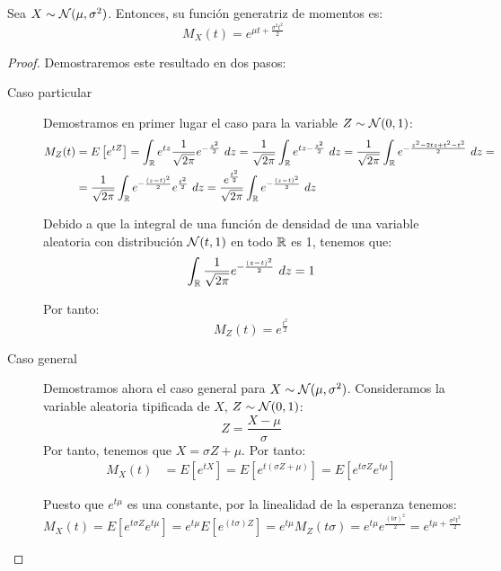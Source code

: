 \begin{prop}
    Sea $X\sim \mathcal{N}(\mu,\sigma^2)$. Entonces, su función generatriz de momentos es:
    \begin{equation*}
        M_X(t) = e^{\mu t + \frac{\sigma^2 t^2}{2}}
    \end{equation*}
\end{prop}
\begin{proof} Demostraremos este resultado en dos pasos:
    \begin{description}
        \item[Caso particular]  Demostramos en primer lugar el caso para la variable $Z\sim \mathcal{N}(0,1)$:
        \begin{align*}
            M_Z(t) &= E\left[e^{tZ}\right]
            = \int_{\mathbb{R}} e^{tz} \dfrac{1}{\sqrt{2\pi}} e^{-\frac{z^2}{2}}~dz
            = \dfrac{1}{\sqrt{2\pi}} \int_{\mathbb{R}} e^{tz-\frac{z^2}{2}}~dz
            = \dfrac{1}{\sqrt{2\pi}} \int_{\mathbb{R}} e^{-\frac{z^2-2tz + t^2-t^2}{2}}~dz
            =\\&= \dfrac{1}{\sqrt{2\pi}} \int_{\mathbb{R}} e^{-\frac{(z-t)^2}{2}}e^{\frac{t^2}{2}}~dz
            = \dfrac{e^{\frac{t^2}{2}}}{\sqrt{2\pi}} \int_{\mathbb{R}} e^{-\frac{(z-t)^2}{2}}~dz
        \end{align*}

        Debido a que la integral de una función de densidad de una variable aleatoria con distribución $\mathcal{N}(t,1)$ en todo $\mathbb{R}$ es 1, tenemos que:
        \begin{equation*}
            \int_{\mathbb{R}} \dfrac{1}{\sqrt{2\pi}} e^{-\frac{(z-t)^2}{2}}~dz = 1
        \end{equation*}

        Por tanto:
        \begin{equation*}
            M_Z(t) = e^{\frac{t^2}{2}}
        \end{equation*}

        \item[Caso general]  Demostramos ahora el caso general para $X\sim \mathcal{N}(\mu,\sigma^2)$. Consideramos la variable aleatoria tipificada de $X$, $Z\sim \mathcal{N}(0,1)$:
        \begin{equation*}
            Z = \dfrac{X-\mu}{\sigma}
        \end{equation*}
        Por tanto, tenemos que $X=\sigma Z + \mu$. Por tanto:
        \begin{align*}
            M_X(t) &= E\left[e^{tX}\right] = E\left[e^{t(\sigma Z + \mu)}\right] = E\left[e^{t\sigma Z}e^{t\mu}\right]
        \end{align*}
    
        Puesto que $e^{t\mu}$ es una constante, por la linealidad de la esperanza tenemos:
        \begin{equation*}
            M_X(t) = E\left[e^{t\sigma Z}e^{t\mu}\right] = e^{t\mu}E\left[e^{(t\sigma) Z}\right]
            = e^{t\mu}M_Z(t\sigma) = e^{t\mu}e^{\frac{(t\sigma)^2}{2}} = e^{t\mu + \frac{\sigma^2 t^2}{2}}
        \end{equation*}
    \end{description}
\end{proof}

